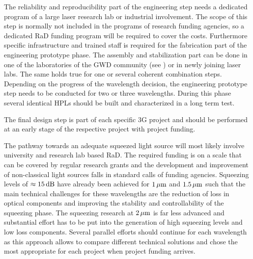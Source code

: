 The reliability and reproducibility part of the engineering step needs a dedicated program of a large laser research lab or industrial involvement. The scope of this step is normally not included in the programs of research funding agencies, so a dedicated \ac{RaD} funding program will be required to cover the costs.
Furthermore specific infrastructure and trained staff is required for the fabrication part of the engineering prototype phase. The assembly and stabilization part can be done in one of the laboratories of the \ac{GWD} community (see \cite{LightSource_RD_table}) or in newly joining laser labs. The same holds true for one or several coherent combination steps. Depending on the progress of the wavelength decision, the engineering prototype step needs to be conducted for two or three wavelengths. During this phase several identical \acp{HPL} should be built and characterized in a long term test.

The final design step is part of each specific \ac{3G}   project and should be performed at an early stage of the respective project with project funding.

The pathway towards an adequate squeezed light source will most likely involve university and research lab based \ac{RaD}. The required funding is on a scale that can be covered by regular research grants and the development and improvement of non-classical light sources falls in standard calls of funding agencies. Squeezing levels of $ \approx 15 \, {\rm dB} $ have already been achieved for  $ 1\, {\rm \mu m}$ and  $ 1.5\, {\rm \mu m}$ such that the main technical challenges for these wavelengths are the reduction of loss in optical components and improving the stability and controllability of the squeezing phase. The squeezing research at $ 2\, {\rm \mu m}$ is far less advanced and substantial effort has to be put into the generation of high squeezing levels and low loss components. Several parallel efforts should continue for each wavelength as this approach allows to compare different technical solutions and chose the most appropriate for each project when project funding arrives.

